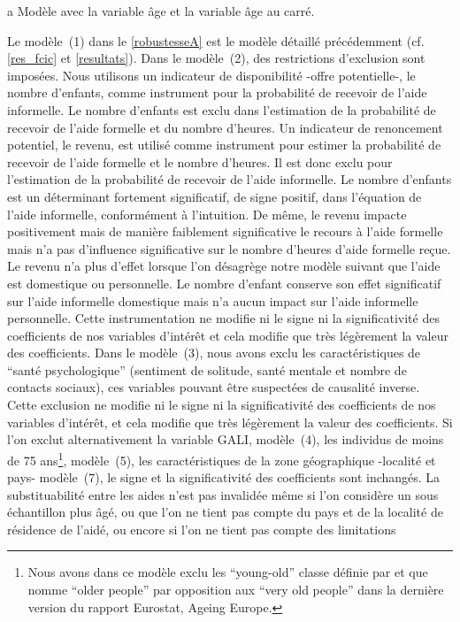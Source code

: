 \begin{Article}
\begin{refsection}[Bonnal]
\begin{table}[t]
{\begin{threeparttable}
\begin{tabular}{l@{}l@{}S@{}S@{}S|@{}S@{}S@{}S|@{}S@{}S@{}S@{}}
\bottomrule
\end{tabular}
\begin{tablenotes}
	\item[a] Modèle avec la variable âge et la variable âge au carré.
\end{tablenotes}
\end{threeparttable}
}
\end{table}%
Le modèle~(1) dans le \autoref{robustesseA} est le modèle détaillé précédemment (cf. \autoref{res_fcic} et \autoref{resultats}). Dans le modèle~(2), des restrictions d'exclusion sont imposées. Nous utilisons un indicateur de disponibilité -offre potentielle-, le nombre d'enfants, comme instrument pour la probabilité de recevoir de l'aide informelle. Le nombre d'enfants est exclu dans l'estimation de la probabilité de recevoir de l'aide formelle et du nombre d'heures. Un indicateur de renoncement potentiel, le revenu, est utilisé comme instrument pour estimer la probabilité de recevoir de l'aide formelle et le nombre d'heures. Il est donc exclu pour l'estimation de la probabilité de recevoir de l'aide informelle. Le nombre d'enfants est un déterminant fortement significatif, de signe positif, dans l'équation de l'aide informelle, conformément à l'intuition. De même, le revenu impacte positivement mais de manière faiblement significative le recours à l'aide formelle mais n'a pas d'influence significative sur le nombre d'heures d'aide formelle reçue. Le revenu n'a plus d'effet lorsque l'on désagrège notre modèle suivant que l'aide est domestique ou personnelle. Le nombre d'enfant conserve son effet significatif sur l'aide informelle domestique mais n'a aucun impact sur l'aide informelle personnelle. Cette instrumentation ne modifie ni le signe ni la significativité des coefficients de nos variables d'intérêt et cela modifie que très légèrement la valeur des coefficients. Dans le modèle~(3), nous avons exclu les caractéristiques de \enquote{santé psychologique} (sentiment de solitude, santé mentale et nombre de contacts sociaux), ces variables pouvant être suspectées de causalité inverse. Cette exclusion ne modifie ni le signe ni la significativité des coefficients de nos variables d'intérêt, et cela modifie que très légèrement la valeur des coefficients. Si l'on exclut alternativement la variable GALI, modèle~(4), les individus de moins de 75 ans\footnote{Nous avons dans ce modèle exclu les \enquote{young-old} classe définie par \textcite{neugarten1974} et que \textcite{eurostat2020} nomme \enquote{older people} par opposition aux \enquote{very old people} dans la dernière version du rapport Eurostat, Ageing Europe.}, modèle~(5), les caractéristiques de la zone géographique -localité et pays- modèle~(7), le signe et la significativité des coefficients sont inchangés. La substituabilité entre les aides n'est pas invalidée même si l'on considère un sous échantillon plus âgé, ou que l'on ne tient pas compte du pays et de la localité de résidence de l'aidé, ou encore si l'on ne tient pas compte des limitations 
\end{refsection}
\end{Article}
